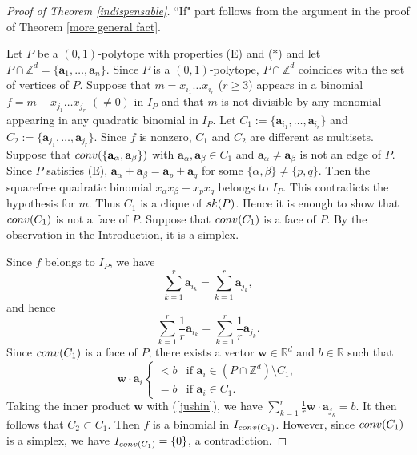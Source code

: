 \documentclass[10pt,a4paper]{amsart}
\numberwithin{thm}{section}
\numberwithin{equation}{section}
\def\NZQ{\mathbb}               %
\def\ZZ{{\NZQ Z}}
\def\RR{{\NZQ R}}
\def\ab{{\mathbf a}}
\def\wb{{\mathbf w}}
\begin{document}
\begin{proof}[Proof of Theorem \ref{indispensable}]
``If" part follows from the argument in the proof of Theorem \ref{more general fact}.

Let $P$ be a $(0,1)$-polytope with properties (E) and ($*$)
and let $P \cap \ZZ^d = \{\ab_1,\dots,\ab_n\}$.
Since $P$ is a $(0,1)$-polytope, $P \cap \ZZ^d$ coincides with the set of vertices of $P$.
    Suppose that $m=x_{i_1} \dots x_{i_r}$ ($r \ge 3$) appears in a 
    binomial $f=m -x_{j_1} \dots x_{j_r}$
    $(\ne 0)$ in $I_P$ and that 
    $m$ is not divisible by any monomial appearing in any quadratic binomial in $I_P$.
    Let $C_1:=\{\ab_{i_1}, \dots, \ab_{i_r}\}$ and $C_2:=\{\ab_{j_1}, \dots, \ab_{j_r}\}$.
Since $f$ is nonzero, $C_1$ and $C_2$
    are different as multisets.   
Suppose that ${\rm conv}(\{\ab_\alpha, \ab_\beta\})$ with $\ab_\alpha, \ab_\beta \in C_1$
and $\ab_\alpha \ne \ab_\beta$
is not an edge of $P$.
Since $P$ satisfies (E),
$\ab_\alpha+\ab_\beta = \ab_p + \ab_q$
for some $\{\alpha, \beta\} \ne \{p,q\}$.
Then 
the squarefree quadratic binomial
$x_\alpha x_\beta - x_p x_q$ belongs to $I_P$.
This contradicts the hypothesis for $m$.
Thus $C_1$ is a clique of ${\rm sk}(P)$.
Hence it is enough to show that  
${\rm conv}(C_1)$ is not a face of $P$.
Suppose that ${\rm conv}(C_1)$ is a face of $P$.
By the observation in the Introduction, it is a simplex.
    
    Since $f$ belongs to $I_P$, we have 
    \[\sum_{k=1}^r \ab_{i_k} = \sum_{k=1}^r \ab_{j_k},\]
    and hence 
\begin{equation}\label{jushin}
\sum_{k=1}^r \frac{1}{r} \ab_{i_k} = \sum_{k=1}^r \frac{1}{r} \ab_{j_k}.
\end{equation}
Since ${\rm conv}(C_1)$ is a face of $P$,
there exists a vector $\wb \in \RR^d$ and $b \in \RR$ such that
\[
\wb \cdot \ab_i 
\begin{cases}
< b &  \mbox{if } \ab_i \in (P\cap \ZZ^d ) \setminus C_1,\\
= b & \mbox{if } \ab_i \in C_1.
\end{cases}
\]
Taking the inner product $\wb$ with (\ref{jushin}),
we have 
$\sum_{k=1}^r \frac{1}{r} \wb \cdot \ab_{j_k} = b$.
It then follows that $C_2 \subset C_1$. 
Then $f$ is a binomial in $I_{{\rm conv}(C_1)}$.
However, since ${\rm conv}(C_1)$ is a simplex, we have 
$I_{{\rm conv}(C_1)}= \{0\}$, a contradiction.
\end{proof}
\end{document}
